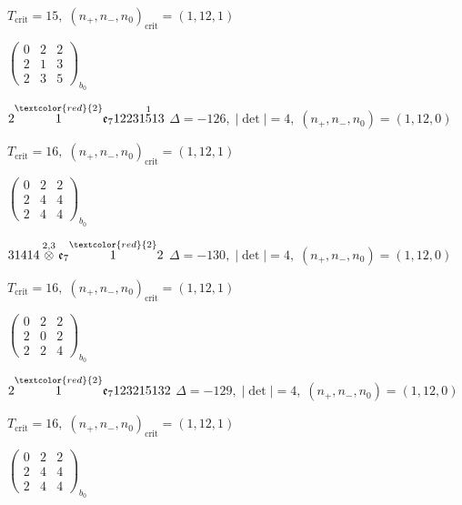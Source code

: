 \documentclass[10pt]{article}
\begin{document}
\hspace{1em}$T_{\text{crit}}=15,\; (n_+,n_-,n_0)_{\text{crit}}=(1,12,1)$

\hspace{2em}$\left(\begin{smallmatrix}0 & 2 & 2 \\ 2 & 1 & 3 \\ 2 & 3 & 5\end{smallmatrix}\right)_{\!b_0}$

$2\overset{\textcolor{red}{2}}{1}\mathfrak{e}_712231\overset{1}{5}13$ \quad $\Delta=-126,\; |\det|=4,\; (n_+,n_-,n_0)=(1,12,0)$

\hspace{1em}$T_{\text{crit}}=16,\; (n_+,n_-,n_0)_{\text{crit}}=(1,12,1)$

\hspace{2em}$\left(\begin{smallmatrix}0 & 2 & 2 \\ 2 & 4 & 4 \\ 2 & 4 & 4\end{smallmatrix}\right)_{\!b_0}$

\smallskip

$31414\overset{2,3}{\otimes}\mathfrak{e}_7\overset{\textcolor{red}{2}}{1}2$ \quad $\Delta=-130,\; |\det|=4,\; (n_+,n_-,n_0)=(1,12,0)$

\hspace{1em}$T_{\text{crit}}=16,\; (n_+,n_-,n_0)_{\text{crit}}=(1,12,1)$

\hspace{2em}$\left(\begin{smallmatrix}0 & 2 & 2 \\ 2 & 0 & 2 \\ 2 & 2 & 4\end{smallmatrix}\right)_{\!b_0}$

\smallskip

$2\overset{\textcolor{red}{2}}{1}\mathfrak{e}_7123215132$ \quad $\Delta=-129,\; |\det|=4,\; (n_+,n_-,n_0)=(1,12,0)$

\hspace{1em}$T_{\text{crit}}=16,\; (n_+,n_-,n_0)_{\text{crit}}=(1,12,1)$

\hspace{2em}$\left(\begin{smallmatrix}0 & 2 & 2 \\ 2 & 4 & 4 \\ 2 & 4 & 4\end{smallmatrix}\right)_{\!b_0}$
\end{document}
